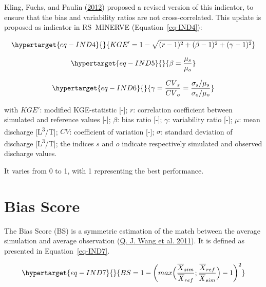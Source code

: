 \documentclass[
  letterpaper,
  DIV=11,
  numbers=noendperiod]{scrreprt}
\begin{document}
Kling, Fuchs, and Paulin
(\protect\hyperlink{ref-kling_runoff_2012}{2012}) proposed a revised
version of this indicator, to ensure that the bias and variability
ratios are not cross-correlated. This update is proposed as indicator in
RS~MINERVE (Equation~\ref{eq-IND4}):

\begin{equation}\protect\hypertarget{eq-IND4}{}{
KGE' = 1 - \sqrt{(r - 1)^{2} + (\beta - 1)^{2} + (\gamma - 1)^{2}}
}\label{eq-IND4}\end{equation}

\begin{equation}\protect\hypertarget{eq-IND5}{}{
\beta = \frac{\mu_{s}}{\mu_{o}}
}\label{eq-IND5}\end{equation}

\begin{equation}\protect\hypertarget{eq-IND6}{}{
\gamma = \frac{{CV}_{s}}{{CV}_{o}} = \frac{\sigma_{s}/\mu_{s}}{\sigma_{o}/\mu_{o}}
}\label{eq-IND6}\end{equation}

with \(KGE'\): modified KGE-statistic {[}-{]}; \(r\): correlation
coefficient between simulated and reference values {[}-{]}; \(\beta\):
bias ratio {[}-{]}; \(\gamma\): variability ratio {[}-{]}; \(\mu\): mean
discharge {[}L\textsuperscript{3}/T{]}; \(CV\): coefficient of variation
{[}-{]}; \(\sigma\): standard deviation of discharge
{[}L\textsuperscript{3}/T{]}; the indices \(s\) and \(o\) indicate
respectively simulated and observed discharge values.

It varies from 0 to 1, with 1 representing the best performance.

\hypertarget{sec-tech_performance_indicators_biasscore}{%
\chapter{Bias Score}\label{sec-tech_performance_indicators_biasscore}}

The Bias Score (BS) is a symmetric estimation of the match between the
average simulation and average observation
(\protect\hyperlink{ref-wang_monthly_2011}{Q. J. Wang et al. 2011}). It
is defined as presented in Equation~\ref{eq-IND7}.

\begin{equation}\protect\hypertarget{eq-IND7}{}{
BS = 1 - \bigg( max \Big(\frac{{\overline{X}}_{sim}}{{\overline{X}}_{ref}};\frac{{\overline{X}}_{ref}}{{\overline{X}}_{sim}} \Big) - 1 \bigg)^2
}\label{eq-IND7}\end{equation}
\end{document}
